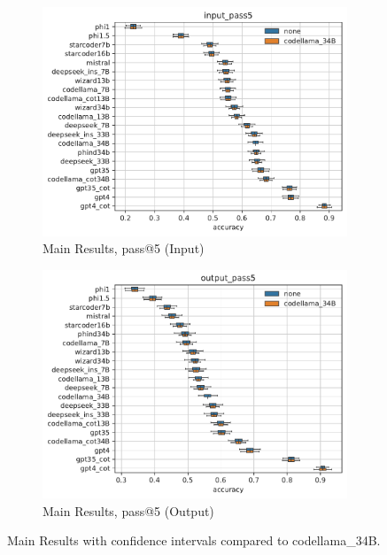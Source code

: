 \begin{figure}[H]
     \newline
     \newline
     \begin{subfigure}[b]{0.49\textwidth}
         \centering
         \includegraphics[scale=0.4]{figs/main_results/main_box_input_pass5.pdf}
         \caption{Main Results, pass@5 (Input)}
         \label{fig:main-results-pass5-input-appendix}
     \end{subfigure}
     \hfill
     \begin{subfigure}[b]{0.49\textwidth}
         \centering
         \includegraphics[scale=0.4]{figs/main_results/main_box_output_pass5.pdf}
         \caption{Main Results, pass@5 (Output)}
         \label{fig:main-results-pass5-output-appendix}
     \end{subfigure}
     \caption{Main Results with confidence intervals compared to codellama\_34B.}
     \label{fig:main-results-all-appendix}
\end{figure}

